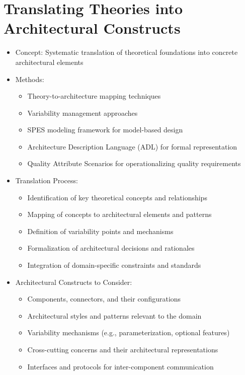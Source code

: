 \documentclass[12pt,a4paper]{article}
\begin{document}
\section{Translating Theories into Architectural Constructs}
\begin{itemize}
    \item Concept: Systematic translation of theoretical foundations into concrete architectural elements
    \item Methods:
    \begin{itemize}
        \item Theory-to-architecture mapping techniques \citep{Eden2006}
        \item Variability management approaches \citep{Galster2014}
        \item SPES modeling framework for model-based design \citep{Nakagawa2023}
        \item Architecture Description Language (ADL) for formal representation \citep{Medvidovic2000}
        \item Quality Attribute Scenarios for operationalizing quality requirements \citep{Bass2003}
    \end{itemize}
    \item Translation Process:
    \begin{itemize}
        \item Identification of key theoretical concepts and relationships
        \item Mapping of concepts to architectural elements and patterns
        \item Definition of variability points and mechanisms
        \item Formalization of architectural decisions and rationales
        \item Integration of domain-specific constraints and standards
    \end{itemize}
    \item Architectural Constructs to Consider:
    \begin{itemize}
        \item Components, connectors, and their configurations
        \item Architectural styles and patterns relevant to the domain
        \item Variability mechanisms (e.g., parameterization, optional features)
        \item Cross-cutting concerns and their architectural representations
        \item Interfaces and protocols for inter-component communication

\end{itemize}
\end{itemize}
\end{document}
